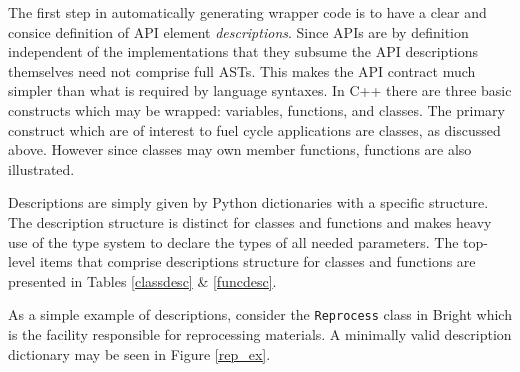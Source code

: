 \documentclass{ansconfpaper}
\newcommand{\vin}[1]{\texttt{{#1}}}
\begin{document}
The first step in automatically generating wrapper code is to have a clear and 
consice definition of API element \emph{descriptions}.  Since APIs are by definition 
independent of the implementations that they subsume the API descriptions themselves
need not comprise full ASTs.  This makes the API contract much simpler than what
is required by language syntaxes.  In C++ there are three
basic constructs which may be wrapped: variables, functions, and classes.  
The primary construct which are of interest to fuel cycle applications are classes, 
as discussed above.  However since classes may own member functions, functions are
also illustrated.

Descriptions are simply given by Python dictionaries with a specific structure.
The description structure is distinct for classes and functions and makes heavy 
use of the type system to declare the types of all needed parameters.  The top-level
items that comprise descriptions structure for classes and functions are presented 
in Tables \ref{classdesc} \& \ref{funcdesc}.

As a simple example of descriptions, consider the \vin{Reprocess} class in Bright 
which is the facility responsible for reprocessing materials. A minimally valid 
description dictionary may be seen in Figure \ref{rep_ex}. 
\end{document}
